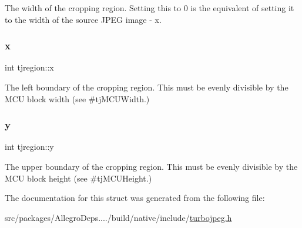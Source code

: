 The width of the cropping region. Setting this to 0 is the equivalent of setting it to the width of the source J\+P\+EG image -\/ x. \mbox{\label{structtjregion_a4b6a37a93997091b26a75831fa291ad9}} 
\subsubsection{\texorpdfstring{x}{x}}
{\footnotesize\ttfamily int tjregion\+::x}

The left boundary of the cropping region. This must be evenly divisible by the M\+CU block width (see \#tj\+M\+C\+U\+Width.) \mbox{\label{structtjregion_a7b3e0c24cfe87acc80e334cafdcf22c2}} 
\subsubsection{\texorpdfstring{y}{y}}
{\footnotesize\ttfamily int tjregion\+::y}

The upper boundary of the cropping region. This must be evenly divisible by the M\+CU block height (see \#tj\+M\+C\+U\+Height.) 

The documentation for this struct was generated from the following file\+:\begin{DoxyCompactItemize}
\item 
src/packages/\+Allegro\+Deps..../build/native/include/\hyperlink{turbojpeg_8h}{turbojpeg.\+h}\end{DoxyCompactItemize}
